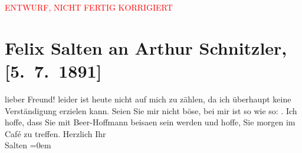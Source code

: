 
\begin{center}
            \textcolor{red}{ENTWURF, NICHT FERTIG KORRIGIERT}
                      \end{center}
            
         
         \renewcommand{\erwaehntePersonen}{Personen: Richard Beer-Hofmann}
         \renewcommand{\erwaehnteOrte}{Orte: Wien}
         \renewcommand{\erwaehnteWerke}{}
               \section[Felix Salten an Arthur Schnitzler, {[}5. 7. 1891{]}]{ Felix Salten an Arthur Schnitzler, {[}5. 7. 1891{]}}\nopagebreak{}\rehead{ }\begin{ledgroupsized}[t]{13cm}\normalsize\beginnumbering \toendnotes[C]{\smallbreak\pagebreak[2]} 
\toendnotes[C]{\smallbreak}\pstart{}{\pb}lieber Freund!\pend\pstart
           leider ist heute nicht auf mich zu zählen, da ich überhaupt keine Verständigung
               erzielen kann. Seien Sie mir nicht böse, bei mir ist so wie so: \label{K_L03183-1v}\label{K_L03183-1h}. \pend
           \pstart
           Ich hoffe, dass Sie mit Beer-Hoffmann beisa{\geminationm}en sein werden und hoffe, Sie morgen im Café zu
               treffen.\pend
           \pstart
           Herzlich Ihr {\\[\baselineskip]}\spacefill\mbox{Salten}\pend
           \leftskip=0em{}
         
         \endnumbering{}\end{ledgroupsized}\begin{anhang}\end{anhang}\newcommand{\dateiname}{L03183}\newcommand{\titel}{Felix Salten an Arthur Schnitzler, [5. 7. 1891]}\newcommand{\editorInnen}{Martin Anton Müller und Laura Untner}
      
